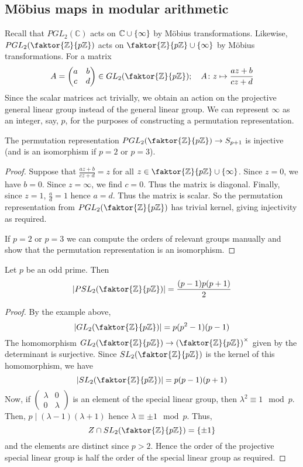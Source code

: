 \subsection{M\"obius maps in modular arithmetic}
Recall that \( PGL_2(\mathbb C) \) acts on \( \mathbb C \cup \qty{\infty} \) by M\"obius transformations.
Likewise, \( PGL_2\qty(\faktor{\mathbb Z}{p\mathbb Z}) \) acts on \( \faktor{\mathbb Z}{p\mathbb Z} \cup \qty{\infty} \) by M\"obius transformations.
For a matrix
\[
	A = \begin{pmatrix}
		a & b \\
		c & d
	\end{pmatrix} \in GL_2\qty(\faktor{\mathbb Z}{p\mathbb Z});\quad A \colon z \mapsto \frac{az+b}{cz+d}
\]
Since the scalar matrices act trivially, we obtain an action on the projective general linear group instead of the general linear group.
We can represent \( \infty \) as an integer, say, \( p \), for the purposes of constructing a permutation representation.
\begin{lemma}
	The permutation representation \( PGL_2\qty(\faktor{\mathbb Z}{p\mathbb Z}) \to S_{p+1} \) is injective (and is an isomorphism if \( p = 2 \) or \( p = 3 \)).
\end{lemma}
\begin{proof}
	Suppose that \( \frac{az+b}{cz+d} = z \) for all \( z \in \faktor{\mathbb Z}{p\mathbb Z} \cup \qty{\infty} \).
	Since \( z = 0 \), we have \( b = 0 \).
	Since \( z = \infty \), we find \( c = 0 \).
	Thus the matrix is diagonal.
	Finally, since \( z = 1 \), \( \frac{a}{d} = 1 \) hence \( a = d \).
	Thus the matrix is scalar.
	So the permutation representation from \( PGL_2\qty(\faktor{\mathbb Z}{p \mathbb Z}) \) has trivial kernel, giving injectivity as required.

	If \( p = 2 \) or \( p = 3 \) we can compute the orders of relevant groups manually and show that the permutation representation is an isomorphism.
\end{proof}
\begin{lemma}
	Let \( p \) be an odd prime.
	Then
	\[
		\abs{PSL_2\qty(\faktor{\mathbb Z}{p\mathbb Z})} = \frac{(p-1)p(p+1)}{2}
	\]
\end{lemma}
\begin{proof}
	By the example above,
	\[
		\abs{GL_2\qty(\faktor{\mathbb Z}{p\mathbb Z})} = p(p^2 - 1)(p - 1)
	\]
	The homomorphism \( GL_2\qty(\faktor{\mathbb Z}{p\mathbb Z}) \to \qty(\faktor{\mathbb Z}{p\mathbb Z})^\times \) given by the determinant is surjective.
	Since \( SL_2\qty(\faktor{\mathbb Z}{p\mathbb Z}) \) is the kernel of this homomorphism, we have
	\[
		\abs{SL_2\qty(\faktor{\mathbb Z}{p\mathbb Z})} = p(p-1)(p+1)
	\]
	Now, if \(
	\begin{pmatrix}
		\lambda & 0 \\ 0 & \lambda
	\end{pmatrix}
	\) is an element of the special linear group, then \( \lambda^2 \equiv 1 \mod p \).
	Then, \( p \mid (\lambda - 1)(\lambda + 1) \) hence \( \lambda \equiv \pm 1 \mod p \).
	Thus,
	\[
		Z \cap SL_2\qty(\faktor{\mathbb Z}{p\mathbb Z}) = \qty{\pm 1}
	\]
	and the elements are distinct since \( p > 2 \).
	Hence the order of the projective special linear group is half the order of the special linear group as required.
\end{proof}
